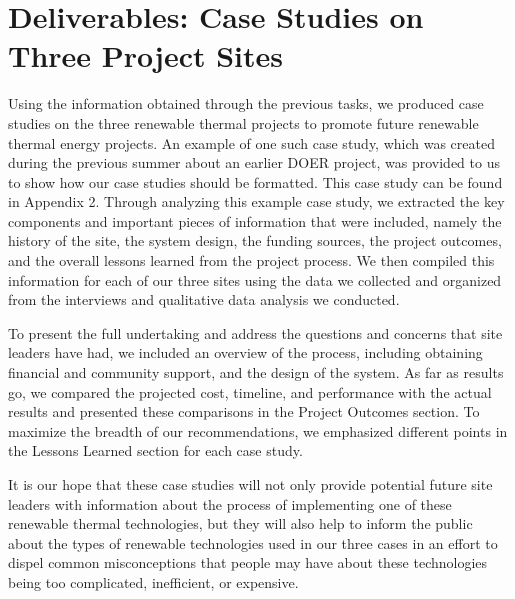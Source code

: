   \section{Deliverables: Case Studies on Three Project Sites}
  \par Using the information obtained through the previous tasks, we produced case studies on the three renewable thermal projects to promote future renewable thermal energy projects. An example of one such case study, which was created during the previous summer about an earlier DOER project, was provided to us to show how our case studies should be formatted. This case study can be found in Appendix 2. Through analyzing this example case study, we extracted the key components and important pieces of information that were included, namely the history of the site, the system design, the funding sources, the project outcomes, and the overall lessons learned from the project process. We then compiled this information for each of our three sites using the data we collected and organized from the interviews and qualitative data analysis we conducted.
  \par To present the full undertaking and address the questions and concerns that site leaders have had, we included an overview of the process, including obtaining financial and community support, and the design of the system. As far as results go, we compared the projected cost, timeline, and performance with the actual results and presented these comparisons in the Project Outcomes section. To maximize the breadth of our recommendations, we emphasized different points in the Lessons Learned section for each case study.
  \par It is our hope that these case studies will not only provide potential future site leaders with information about the process of implementing one of these renewable thermal technologies, but they will also help to inform the public about the types of renewable technologies used in our three cases in an effort to dispel common misconceptions that people may have about these technologies being too complicated, inefficient, or expensive. 
